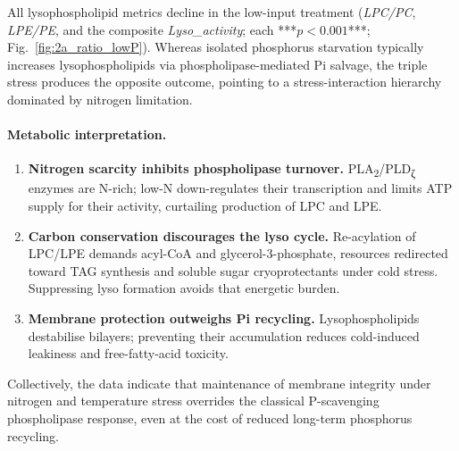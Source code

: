 \documentclass[10pt,letterpaper]{article}
\begin{document}
All lysophospholipid metrics decline in the low-input treatment  
(\textit{LPC/PC}, \textit{LPE/PE}, and the composite \textit{Lyso\_activity};  
each ***$p<0.001$***; Fig.~\ref{fig:2a_ratio_lowP}).  
Whereas isolated phosphorus starvation typically increases lysophospholipids
via phospholipase-mediated Pi salvage, the triple stress produces the
opposite outcome, pointing to a stress-interaction hierarchy dominated by nitrogen
limitation.

\paragraph{Metabolic interpretation.}
\begin{enumerate}
  \item \textbf{Nitrogen scarcity inhibits phospholipase turnover.}  
        PLA\textsubscript{2}/PLD\textsubscript{ζ} enzymes are N-rich; low-N
        down-regulates their transcription and limits ATP supply for their activity,
        curtailing production of LPC and LPE.
  \item \textbf{Carbon conservation discourages the lyso cycle.}  
        Re-acylation of LPC/LPE demands acyl-CoA and glycerol-3-phosphate,
        resources redirected toward TAG synthesis and soluble sugar
        cryoprotectants under cold stress.  Suppressing lyso formation avoids that
        energetic burden.
  \item \textbf{Membrane protection outweighs Pi recycling.}  
        Lysophospholipids destabilise bilayers; preventing their accumulation
        reduces cold-induced leakiness and free-fatty-acid toxicity.
\end{enumerate}

Collectively, the data indicate that maintenance of membrane integrity under
nitrogen and temperature stress overrides the classical P-scavenging
phospholipase response, even at the cost of reduced long-term phosphorus
recycling.
\end{document}

